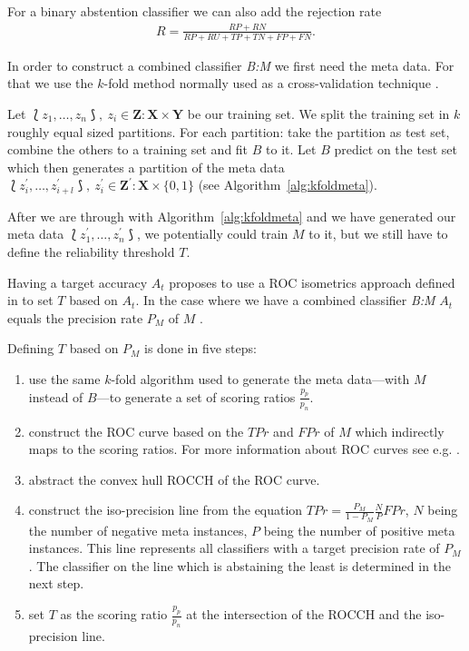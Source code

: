 \documentclass[twoside,11pt]{article}
\begin{document}
For a binary abstention classifier we can also add the
rejection rate
\begin{align*}
R = \frac{RP + RN}{RP + RU + TP + TN + FP + FN}.
\end{align*}

In order to construct a combined classifier \textit{B:M}
we first need the meta data.
For that we use the $k$-fold method normally used as a
cross-validation technique
\citep[see][Chapter 7.10]{elem_stat}.

Let $\Lbag z_1,\dots,z_n \Rbag,\ z_i \in \textbf{Z}:
\textbf{X} \times \textbf{Y}$ be our training set.
We split the training set in $k$ roughly equal sized
partitions.
For each partition: take the partition as test set,
combine the others to a training set and fit $B$ to it.
Let $B$ predict on the test set which then generates a
partition of the meta data
$\Lbag z^{\prime}_i,\dots,z^{\prime}_{i+l} \Rbag,\
z^{\prime}_i \in \textbf{Z}^{\prime}: \textbf{X} \times
\{0,1\}$ (see Algorithm~\ref{alg:kfoldmeta}).

After we are through with Algorithm~\ref{alg:kfoldmeta} and
we have generated our meta data
$\Lbag z^{\prime}_1,\dots,z^{\prime}_n \Rbag$, we
potentially could train $M$ to it, but we still have to
define the reliability threshold $T$.

Having a target accuracy $A_t$ \citet{smirnov_et_al_2009}
proposes to use a ROC isometrics approach defined in
\citet{vanderlooy_et_al_2009} to set $T$ based on $A_t$.
In the case where we have a combined classifier
\textit{B:M} $A_t$ equals the precision rate $P_M$ of $M$
\citep[see][]{smirnov_et_al_2009}.

Defining $T$ based on $P_M$ is done in five steps:

\begin{enumerate}

  \item use the same $k$-fold algorithm used to generate
        the meta data---with $M$ instead of $B$---to
        generate a set of scoring ratios $\frac{p_p}{p_n}$.

  \item construct the ROC curve based on the $TPr$ and
        $FPr$ of $M$ which indirectly maps to the scoring
        ratios. For more information about ROC curves
        see e.g. \citet{fawcett_2006}.

  \item abstract the convex hull ROCCH of the ROC curve.

  \item construct the iso-precision line from the equation
        $TPr = \frac{P_M}{1-P_M} \frac{N}{P} FPr$, $N$
        being the number of negative meta instances, $P$
        being the number of positive meta instances.
        This line represents all classifiers with a target
        precision rate of $P_M$. The classifier on the line
        which is abstaining the least is determined in the
        next step.

  \item set $T$ as the scoring ratio $\frac{p_p}{p_n}$ at
        the intersection of the ROCCH and the iso-precision
        line.

\end{enumerate}
\end{document}
